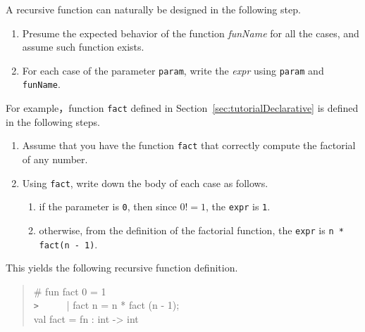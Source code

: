 \documentclass{jbook}
\begin{document}
	A recursive function can naturally be designed in the following step.
\begin{enumerate}
\item 
	Presume the expected behavior of the function 
{\it funName} for all the cases, and assume such function exists.
\item 
	For each case of the parameter {\tt param}, write the {\it expr}
using {\tt param} and {\tt funName}.
\end{enumerate}
	For example，function {\tt fact} defined in
Section~\ref{sec:tutorialDeclarative} is defined in the following
steps.
\begin{enumerate}
\item Assume that you have the function {\tt fact} that correctly
compute the factorial of any number.
\item Using {\tt fact}, write down the body of each case as follows.
\begin{enumerate}
\item if the parameter is {\tt 0}, then since $0!=1$, the {\tt expr} is {\tt 1}.
\item otherwise, from the definition of the factorial function, 
the {\tt expr} is {\tt n * fact(n - 1)}.
\end{enumerate}
\end{enumerate}
	This yields the following recursive function definition.
\begin{tt}
\begin{quote}
\# fun fact 0 = 1\\
\verb|>| \ \ \ \ \ | fact n = n * fact (n - 1);\\
val fact = fn : int -> int
\end{quote}
\end{tt}
\fi%
\end{document}
